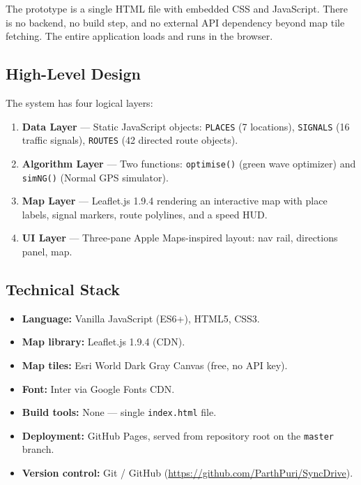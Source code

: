 \documentclass[12pt,a4paper]{report}
\begin{document}
The prototype is a single HTML file with embedded CSS and JavaScript. There is
no backend, no build step, and no external API dependency beyond map tile
fetching. The entire application loads and runs in the browser.

\subsection{High-Level Design}

The system has four logical layers:

\begin{enumerate}
  \item \textbf{Data Layer} --- Static JavaScript objects: \texttt{PLACES}
    (7 locations), \texttt{SIGNALS} (16 traffic signals), \texttt{ROUTES}
    (42 directed route objects).
  \item \textbf{Algorithm Layer} --- Two functions: \texttt{optimise()} (green
    wave optimizer) and \texttt{simNG()} (Normal GPS simulator).
  \item \textbf{Map Layer} --- Leaflet.js 1.9.4 rendering an interactive map
    with place labels, signal markers, route polylines, and a speed HUD.
  \item \textbf{UI Layer} --- Three-pane Apple Maps-inspired layout: nav rail,
    directions panel, map.
\end{enumerate}

\subsection{Technical Stack}

\begin{itemize}
  \item \textbf{Language:} Vanilla JavaScript (ES6+), HTML5, CSS3.
  \item \textbf{Map library:} Leaflet.js 1.9.4 (CDN).
  \item \textbf{Map tiles:} Esri World Dark Gray Canvas (free, no API key).
  \item \textbf{Font:} Inter via Google Fonts CDN.
  \item \textbf{Build tools:} None --- single \texttt{index.html} file.
  \item \textbf{Deployment:} GitHub Pages, served from repository root on the
    \texttt{master} branch.
  \item \textbf{Version control:} Git / GitHub
    (\url{https://github.com/ParthPuri/SyncDrive}).
\end{itemize}
\end{document}
